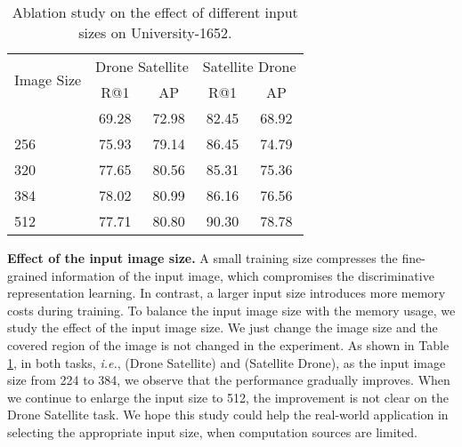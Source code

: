 \documentclass[journal]{IEEEtran}
\def\ie{\emph{i.e.}}
\begin{document}
\setlength{\tabcolsep}{10pt}
\begin{table}[htp]
\small
\caption{Ablation study on the effect of different input sizes on University-1652. 
}
\begin{center}
\begin{tabular}{l|cc|cc}
\hline
\multirow{2}{*}{Image Size}& \multicolumn{2}{c|}{Drone  Satellite} & \multicolumn{2}{c}{Satellite  Drone}\\
  & R@1 & AP & R@1 & AP\\
\shline
224 & 69.28 & 72.98 & 82.45 & 68.92 \\
256 & 75.93 & 79.14 & 86.45 & 74.79 \\
320 & 77.65 & 80.56 & 85.31 & 75.36 \\
384 & 78.02 & 80.99 & 86.16 & 76.56 \\
512 & 77.71 & 80.80 & 90.30 & 78.78 \\
\hline
\end{tabular}
\end{center}
\label{table:Size}
\end{table}

\textbf{Effect of the input image size.}
A small training size compresses the fine-grained information of the input image, which compromises the discriminative representation learning. In contrast, a larger input size introduces more memory costs during training. 
To balance the input image size with the memory usage, we study the effect of the input image size. We just change the image size and the covered region of the image is not changed in the experiment. As shown in Table \ref{table:Size}, in both tasks, \ie, (Drone  Satellite) and (Satellite  Drone), as the input image size from 224 to 384, we observe that the performance gradually improves. When we continue to enlarge the input size to 512, the improvement is not clear on the Drone  Satellite task. We hope this study could help the real-world application in selecting the appropriate input size, when computation sources are limited.  
\end{document}
